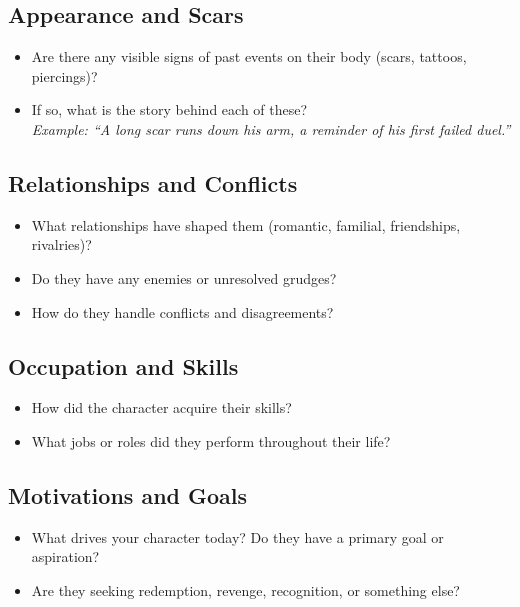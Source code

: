 \subsection*{Appearance and Scars}

\begin{itemize}
    \item Are there any visible signs of past events on their body (scars, tattoos, piercings)?
    \item If so, what is the story behind each of these? \\
    \textit{Example: ``A long scar runs down his arm, a reminder of his first failed duel.''}
\end{itemize}

\subsection*{Relationships and Conflicts}

\begin{itemize}
    \item What relationships have shaped them (romantic, familial, friendships, rivalries)?
    \item Do they have any enemies or unresolved grudges?
    \item How do they handle conflicts and disagreements?
\end{itemize}

\subsection*{Occupation and Skills}

\begin{itemize}
    \item How did the character acquire their skills?
    \item What jobs or roles did they perform throughout their life?
\end{itemize}

\subsection*{Motivations and Goals}

\begin{itemize}
    \item What drives your character today? Do they have a primary goal or aspiration?
    \item Are they seeking redemption, revenge, recognition, or something else?
\end{itemize}

